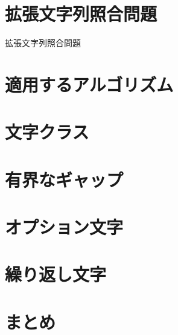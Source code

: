 \documentclass[14pt, dvipdfmx]{beamer}
\title{}
\institute{北海道大学　情報知識ネットワーク研究室　M2}
\author{光吉　健汰}
\begin{document}
\maketitle
{}
\section{拡張文字列照合問題}
\begin{frame}{拡張文字列照合問題}

\end{frame}
\section{適用するアルゴリズム}
\section{文字クラス}
\section{有界なギャップ}
\section{オプション文字}
\section{繰り返し文字}
\section{まとめ}
\end{document}
